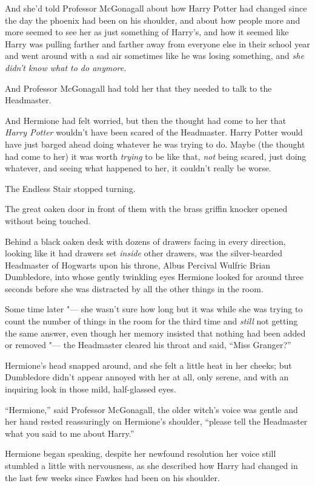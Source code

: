 And she'd told Professor McGonagall about how Harry Potter had changed
since the day the phoenix had been on his shoulder, and about how people
more and more seemed to see her as just something of Harry's, and how it
seemed like Harry was pulling farther and farther away from everyone
else in their school year and went around with a sad air sometimes like
he was losing something, and \emph{she didn't know what to do anymore.}

And Professor McGonagall had told her that they needed to talk to the
Headmaster.

And Hermione had felt worried, but then the thought had come to her that
\emph{Harry Potter} wouldn't have been scared of the Headmaster. Harry
Potter would have just barged ahead doing whatever he was trying to do.
Maybe (the thought had come to her) it was worth \emph{trying} to be
like that, \emph{not} being scared, just doing whatever, and seeing what
happened to her, it couldn't really be worse.

The Endless Stair stopped turning.

The great oaken door in front of them with the brass griffin knocker
opened without being touched.

Behind a black oaken desk with dozens of drawers facing in every
direction, looking like it had drawers set \emph{inside} other drawers,
was the silver-bearded Headmaster of Hogwarts upon his throne, Albus
Percival Wulfric Brian Dumbledore, into whose gently twinkling eyes
Hermione looked for around three seconds before she was distracted by
all the other things in the room.

Some time later "--- she wasn't sure how long but it was while she was
trying to count the number of things in the room for the third time and
\emph{still} not getting the same answer, even though her memory
insisted that nothing had been added or removed "--- the Headmaster cleared
his throat and said, ``Miss Granger?''

Hermione's head snapped around, and she felt a little heat in her
cheeks; but Dumbledore didn't appear annoyed with her at all, only
serene, and with an inquiring look in those mild, half-glassed eyes.

``Hermione,'' said Professor McGonagall, the older witch's voice was
gentle and her hand rested reassuringly on Hermione's shoulder, ``please
tell the Headmaster what you said to me about Harry.''

Hermione began speaking, despite her newfound resolution her voice still
stumbled a little with nervousness, as she described how Harry had
changed in the last few weeks since Fawkes had been on his shoulder.

